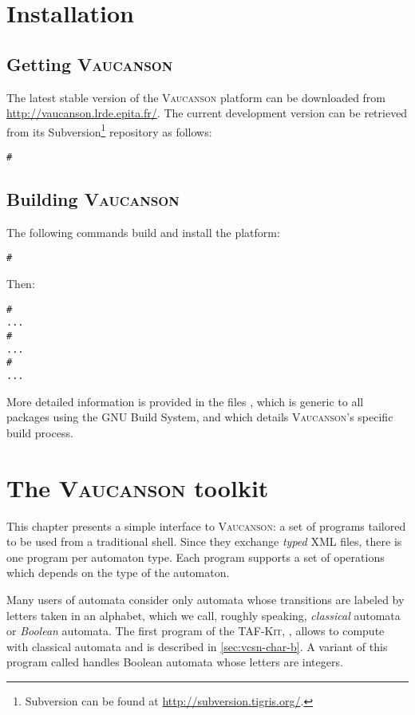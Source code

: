 \documentclass[a4paper]{report}
\newenvironment{shell}
{\begin{alltt}}
{\end{alltt}}
\newcommand{\tafkit}{\textsc{TAF-Kit}\xspace}
\newcommand{\Vauc}{\textsc{Vaucanson}\xspace}
\begin{document}
\chapter{Installation}

\section{Getting \Vauc}

The latest stable version of the \Vauc platform can be downloaded
from \url{http://vaucanson.lrde.epita.fr/}.  The current development
version can be retrieved from its Subversion\footnote{%
  Subversion can be found at \url{http://subversion.tigris.org/}.
} repository as follows:

\begin{shell}
# 
\end{shell}

\section{Building \Vauc}

The following commands build and install the platform:
\begin{shell}
# 
\end{shell}
Then:
\begin{shell}
# 
...
# 
...
# 
...
\end{shell}

More detailed information is provided in the files ,
which is generic to all packages using the GNU Build System, and
 which details \Vauc's specific build process.

\chapter{The \Vauc toolkit}
\label{sec:tafkit}

This chapter presents a simple interface to \Vauc: a set of programs
tailored to be used from a traditional shell.  Since they exchange
\emph{typed} XML files, there is one program per automaton type.  Each
program supports a set of operations which depends on the type of the
automaton.

Many users of automata consider only automata whose transitions are
labeled by letters taken in an alphabet, which we call, roughly
speaking, \emph{classical} automata or \emph{Boolean} automata.  The
first program of the \tafkit, , allows to compute
with classical automata and is described in \autoref{sec:vcsn-char-b}.
A variant of this program called  handles Boolean
automata whose letters are integers.
\end{document}
